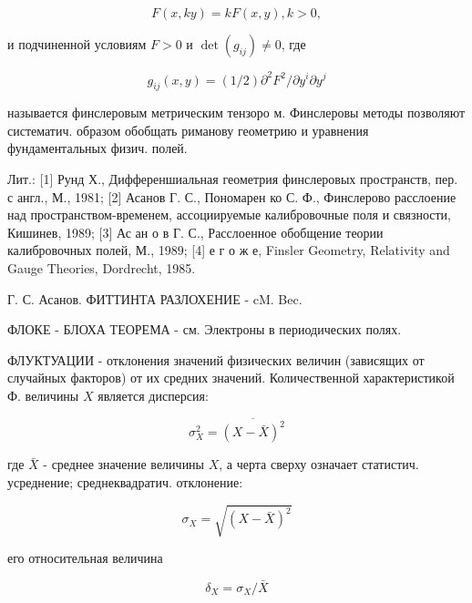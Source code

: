 \documentclass[10pt]{article}
\begin{document}
\[

F(x, k y)=k F(x, y), k>0,

\]



и подчиненной условиям $F>0$ и $\operatorname{det}\left(g_{i j}\right) \neq 0$, где



\[

g_{i j}(x, y)=(1 / 2) \partial^{2} F^{2} / \partial y^{i} \partial y^{j}

\]



называется финслеровым метрическим тензоро м. Финслеровы методы позволяют систематич. образом обобщать риманову геометрию и уравнения фундаментальных физич. полей.



Лит.: [1] Рунд Х., Дифференшиальная геометрия финслеровых пространств, пер. с англ., М., 1981; [2] Асанов Г. С., Пономарен ко С. Ф., Финслерово расслоение над пространством-временем, ассоциируемые калибровочные поля и связности, Кишинев, 1989; [3] Ас ан о в Г. С., Расслоенное обобщение теории калибровочных полей, М., 1989; [4] е г о ж е, Finsler Geometry, Relativity and Gauge Theories, Dordrecht, 1985.

Г. С. Асанов. ФИТТИНТА РАЗЛОХЕНИЕ - cM. Bec.



ФЛОКЕ - БЛОХА ТЕОРЕМА - см. Электроны в периодических полях.



ФЛУКТУАЦИИ - отклонения значений физических величин (зависящих от случайных факторов) от их средних значений. Количественной характеристикой Ф. величины $X$ является дисперсия:



\[

\sigma_{X}^{2}=\overline{(X-\bar{X})^{2}}

\]



где $\bar{X}$ - среднее значение величины $X$, а черта сверху означает статистич. усреднение; среднеквадратич. отклонение:



\[

\sigma_{X}=\sqrt{(X-\bar{X})^{2}}

\]



его относительная величина



\[

\delta_{X}=\sigma_{X} / \bar{X}

\]
\end{document}
